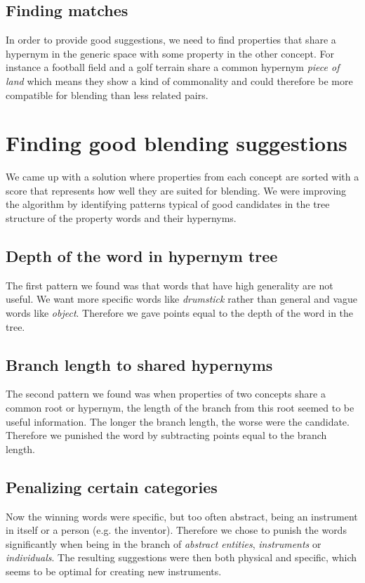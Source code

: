 \subsection{Finding matches}
In order to provide good suggestions, we need to find properties that share a hypernym in the generic space with some property in the other concept. For instance a football field and a golf terrain share a common hypernym \emph{piece of land} which means they show a kind of commonality and could therefore be more compatible for blending than less related pairs. 


\section{Finding good blending suggestions}
We came up with a solution where properties from each concept are sorted with a score that represents how well they are suited for blending. We were improving the algorithm by identifying patterns typical of good candidates in the tree structure of the property words and their hypernyms.
\subsection{Depth of the word in hypernym tree}
The first pattern we found was that words that have high generality are not useful. We want more specific words like \emph{drumstick} rather than general and vague words like \emph{object}. Therefore we gave points equal to the depth of the word in the tree.
\subsection{Branch length to shared hypernyms}
The second pattern we found was when properties of two concepts share a common root or hypernym, the length of the branch from this root seemed to be useful information. The longer the branch length, the worse were the candidate. Therefore we punished the word by subtracting points equal to the branch length.
\subsection{Penalizing certain categories}
Now the winning words were specific, but too often abstract, being an instrument in itself or a person (e.g. the inventor). Therefore we chose to punish the words significantly when being in the branch of \emph{abstract entities}, \emph{instruments} or \emph{individuals}. The resulting suggestions were then both physical and specific, which seems to be optimal for creating new instruments.
